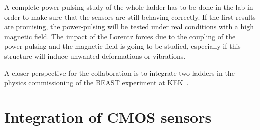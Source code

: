     A complete power-pulsing study of the whole ladder has to be done in the lab in order to make sure that the sensors are still behaving correctly.
    If the first results are promising, the power-pulsing will be tested under real conditions with a high magnetic field.
    The impact of the Lorentz forces due to the coupling of the power-pulsing and the magnetic field is going to be studied, especially if this structure will induce unwanted deformations or vibrations. 


    A closer perspective for the collaboration is to integrate two ladders in the physics commissioning of the \gls{BEAST} experiment at KEK~\cite{Ye}.

  \section{Integration of CMOS sensors}
  \label{sec:CMOS}


